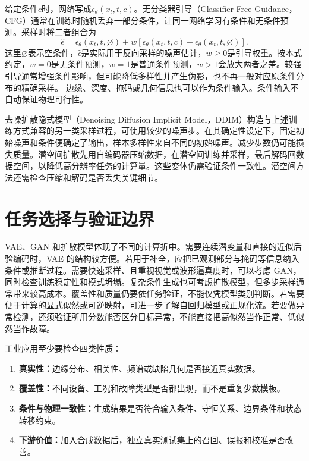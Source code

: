 给定条件$c$时，网络写成$\epsilon_{\theta}(x_t,t,c)$。无分类器引导（Classifier-Free Guidance，CFG）通常在训练时随机丢弃一部分条件，让同一网络学习有条件和无条件预测。采样时将二者组合为
\begin{equation}
\widehat\epsilon=\epsilon_{\theta}(x_t,t,\varnothing)+w\left[\epsilon_{\theta}(x_t,t,c)-\epsilon_{\theta}(x_t,t,\varnothing)\right].
\end{equation}
这里$\varnothing$表示空条件，$\widehat\epsilon$是实际用于反向采样的噪声估计，$w\geq0$是引导权重。按本式约定，$w=0$是无条件预测，$w=1$是普通条件预测，$w>1$会放大两者之差。较强引导通常增强条件影响，但可能降低多样性并产生伪影，也不再一般对应原条件分布的精确采样。
边缘、深度、掩码或几何信息也可以作为条件输入。条件输入不自动保证物理可行性。

去噪扩散隐式模型（Denoising Diffusion Implicit Model，DDIM）构造与上述训练方式兼容的另一类采样过程，可使用较少的噪声步。在其确定性设定下，固定初始噪声和条件便确定了输出，样本多样性来自不同的初始噪声。减少步数仍可能损失质量。潜空间扩散先用自编码器压缩数据，在潜空间训练并采样，最后解码回数据空间，以降低高分辨率任务的计算量。这些变体仍需验证条件一致性。潜空间方法还需检查压缩和解码是否丢失关键细节。

\section{任务选择与验证边界}

VAE、GAN 和扩散模型体现了不同的计算折中。需要连续潜变量和直接的近似后验编码时，VAE 的结构较方便。若用于补全，应把已观测部分与掩码等信息纳入条件或推断过程。需要快速采样、且重视视觉或波形逼真度时，可以考虑 GAN，同时检查训练稳定性和模式坍塌。复杂条件生成也可考虑扩散模型，但多步采样通常带来较高成本。覆盖性和质量仍要依任务验证，不能仅凭模型类别判断。若需要便于计算的显式似然或可逆映射，可进一步了解自回归模型或正规化流。若要做异常检测，还须验证所用分数能否区分目标异常，不能直接把高似然当作正常、低似然当作故障。

工业应用至少要检查四类性质：
\begin{enumerate}
  \item \textbf{真实性：}边缘分布、相关性、频谱或缺陷几何是否接近真实数据。
  \item \textbf{覆盖性：}不同设备、工况和故障类型是否都出现，而不是重复少数模板。
  \item \textbf{条件与物理一致性：}生成结果是否符合输入条件、守恒关系、边界条件和状态转移约束。
  \item \textbf{下游价值：}加入合成数据后，独立真实测试集上的召回、误报和校准是否改善。
\end{enumerate}

